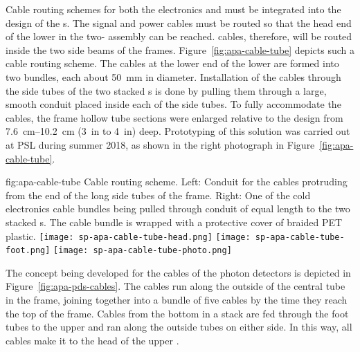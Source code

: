 Cable routing schemes for both the  electronics and  must be integrated into the design of the s.   The  signal and power cables must be routed so that the head end of the lower  in the two- assembly can be reached.  cables, therefore, will be routed inside the two side beams of the  frames. Figure~\ref{fig:apa-cable-tube} depicts such a cable routing scheme.  The  cables at the lower end of the lower  are formed into two bundles, each about \SI{50}{mm} in diameter. Installation of the cables through the side tubes of the two stacked s is done by pulling them through a large, smooth conduit placed inside each of the side tubes.  To fully accommodate the cables, the  frame hollow tube sections were enlarged relative to the  design from \SIrange{7.6}{10.2}{cm} (\SI{3}{in} to \SI{4}{in}) deep. Prototyping of this solution was carried out at PSL during summer 2018, as shown in the right photograph in Figure~\ref{fig:apa-cable-tube}.     


\begin{dunefigure}{fig:apa-cable-tube}
{Cable routing scheme. Left: Conduit for the  cables protruding from the end of the long side tubes of the  frame.  Right: One of the cold electronics cable bundles being pulled through conduit of equal length to the two stacked s.  The cable bundle is wrapped with a protective cover of braided PET plastic.  }
\texttt{[image: sp-apa-cable-tube-head.png]} \quad
\texttt{[image: sp-apa-cable-tube-foot.png]} \quad
\texttt{[image: sp-apa-cable-tube-photo.png]}
\end{dunefigure}

The concept being developed for the cables of the photon detectors is depicted in Figure~\ref{fig:apa-pds-cables}.  The cables run along the outside of the central tube in the  frame, joining together into a bundle of five cables by the time they reach the top of the frame.  Cables from the bottom  in a stack are fed through the foot tubes to the upper  and ran along the outside tubes on either side.  In this way, all  cables make it to the head of the upper .  

